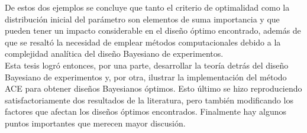 De estos dos ejemplos se concluye que tanto el criterio de optimalidad como la distribución inicial del parámetro son elementos de suma importancia y que pueden tener un impacto considerable en el diseño óptimo encontrado, además de que se resaltó la necesidad de emplear métodos computacionales debido a la complejidad analítica del diseño Bayesiano de experimentos. \\













Esta tesis logró entonces, por una parte, desarrollar la teoría detrás del diseño Bayesiano de experimentos y, por otra, ilustrar la implementación del método ACE para obtener diseños Bayesianos óptimos. Esto último se hizo reproduciendo satisfactoriamente dos resultados de la literatura, pero también modificando los factores que afectan los diseños óptimos encontrados. Finalmente hay algunos puntos importantes que merecen mayor discusión. \\



